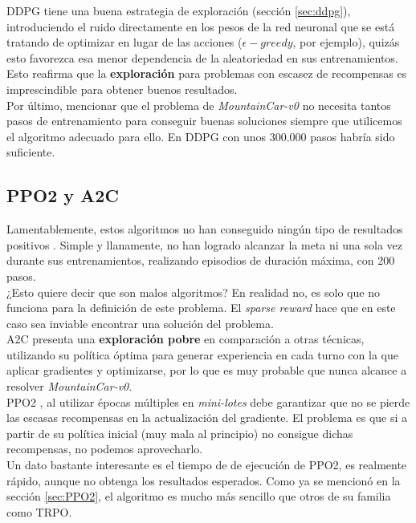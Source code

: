 \documentclass[11pt,fleqn]{book} %
\begin{document}
DDPG tiene una buena estrategia de exploración (sección \ref{sec:ddpg}), introduciendo el ruido directamente en los pesos de la red neuronal que se está tratando de optimizar en lugar de las acciones ($\epsilon-greedy$, por ejemplo), quizás esto favorezca esa menor dependencia de la aleatoriedad en sus entrenamientos. Esto reafirma que la \textbf{exploración} para problemas con escasez de recompensas es imprescindible para obtener buenos resultados. \\

Por último, mencionar que el problema de \textit{MountainCar-v0} no necesita tantos pasos de entrenamiento para conseguir buenas soluciones siempre que utilicemos el algoritmo adecuado para ello. En DDPG con unos 300.000 pasos habría sido suficiente.\\

\subsection{PPO2 y A2C}

Lamentablemente, estos algoritmos no han conseguido ningún tipo de resultados positivos \cite{article:sparse}. Simple y llanamente, no han logrado alcanzar la meta ni una sola vez durante sus entrenamientos, realizando episodios de duración máxima, con 200 pasos. \\

¿Esto quiere decir que son malos algoritmos? En realidad no, es solo que no funciona para la definición de este problema. El \textit{sparse reward} hace que en este caso sea inviable encontrar una solución del problema. \\

A2C presenta una \textbf{exploración pobre} en comparación a otras técnicas, utilizando su política óptima para generar experiencia en cada turno con la que aplicar gradientes y optimizarse, por lo que es muy probable que nunca alcance a resolver \textit{MountainCar-v0}. \\

PPO2 , al utilizar épocas múltiples en \textit{mini-lotes} debe garantizar que no se pierde las escasas recompensas en la actualización del gradiente. El problema es que si a partir de su política inicial (muy mala al principio) no consigue dichas recompensas, no podemos aprovecharlo. \\

Un dato bastante interesante es el tiempo de de ejecución de PPO2, es realmente rápido, aunque no obtenga los resultados esperados. Como ya se mencionó en la sección \ref{sec:PPO2}, el algoritmo es mucho más sencillo que otros de su familia como TRPO. \\
\end{document}
